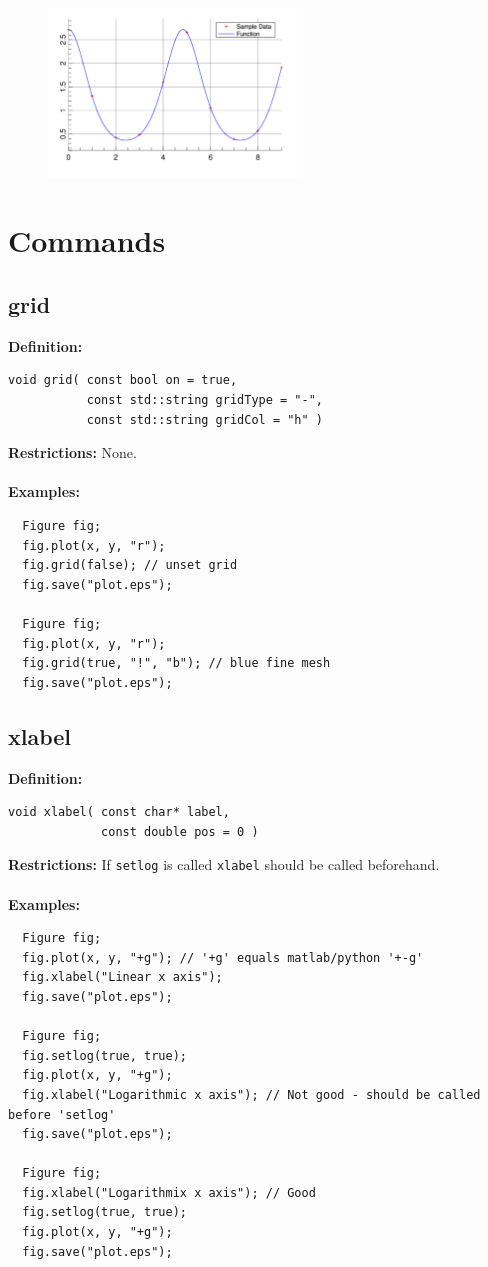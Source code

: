 \documentclass[a4paper]{article}
\newcommand{\command}[1]{\subsection{#1}}
\begin{document}
\begin{figure}[h]
  \centering
  \includegraphics[width=0.6\textwidth]{opening-example.pdf}
  \thispagestyle{empty}
\end{figure}

\restoregeometry
\newpage
\section{Commands}

\command{grid}

\textbf{Definition:}
\begin{lstlisting}
void grid( const bool on = true, 
           const std::string gridType = "-", 
           const std::string gridCol = "h" )
\end{lstlisting}
%
\textbf{Restrictions:} None. \\ \\
%
\textbf{Examples:}
\begin{lstlisting}
  Figure fig;
  fig.plot(x, y, "r");
  fig.grid(false); // unset grid
  fig.save("plot.eps");

  Figure fig;
  fig.plot(x, y, "r");
  fig.grid(true, "!", "b"); // blue fine mesh
  fig.save("plot.eps");
\end{lstlisting}

\command{xlabel}

\textbf{Definition:}
\begin{lstlisting}
void xlabel( const char* label, 
             const double pos = 0 )
\end{lstlisting}
%
\textbf{Restrictions:} If \texttt{setlog} is called \texttt{xlabel} should be called beforehand. \\ \\
%
\textbf{Examples:}
\begin{lstlisting}
  Figure fig;
  fig.plot(x, y, "+g"); // '+g' equals matlab/python '+-g'
  fig.xlabel("Linear x axis");
  fig.save("plot.eps");

  Figure fig;
  fig.setlog(true, true);
  fig.plot(x, y, "+g");
  fig.xlabel("Logarithmic x axis"); // Not good - should be called before 'setlog'
  fig.save("plot.eps");

  Figure fig;
  fig.xlabel("Logarithmix x axis"); // Good
  fig.setlog(true, true);
  fig.plot(x, y, "+g");
  fig.save("plot.eps");
\end{lstlisting}
\end{document}
